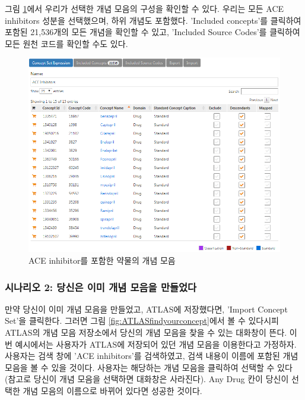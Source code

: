 \documentclass[10.5pt]{book}
\theoremstyle{definition}
\theoremstyle{definition}
\theoremstyle{definition}
\theoremstyle{remark}
\begin{document}
그림 \ref{fig:aceConceptSetExpression}에서 우리가 선택한 개념 모음의
구성을 확인할 수 있다. 우리는 모든 ACE inhibitors 성분을 선택했으며,
하위 개념도 포함했다. 'Included concepts'를 클릭하여 포함된 21,536개의
모든 개념을 확인할 수 있고, 'Included Source Codes'를 클릭하여 모든 원천
코드를 확인할 수도 있다.

\begin{figure}

{\centering \includegraphics[width=1\linewidth]{images/Cohorts/aceConceptSetExpression} 

}

\caption{ACE inhibitor를 포함한 약물의 개념 모음}\label{fig:aceConceptSetExpression}
\end{figure}

\subsubsection*{시나리오 2: 당신은 이미 개념 모음을
만들었다}\label{-2-----}

만약 당신이 이미 개념 모음을 만들었고, ATLAS에 저장했다면, 'Import
Concept Set'을 클릭한다. 그러면 그림 \ref{fig:ATLASfindyourconcept}에서
볼 수 있다시피 ATLAS의 개념 모음 저장소에서 당신의 개념 모음을 찾을 수
있는 대화창이 뜬다. 이번 예시에서는 사용자가 ATLAS에 저장되어 있던 개념
모음을 이용한다고 가정하자. 사용자는 검색 창에 'ACE inhibitors'를
검색하였고, 검색 내용이 이름에 포함된 개념 모음을 볼 수 있을 것이다.
사용자는 해당하는 개념 모음을 클릭하여 선택할 수 있다 (참고로 당신이
개념 모음을 선택하면 대화창은 사라진다). Any Drug 칸이 당신이 선택한
개념 모음의 이름으로 바뀌어 있다면 성공한 것이다.
\end{document}
